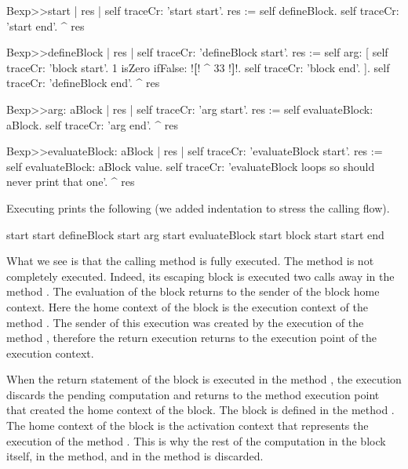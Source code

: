 \documentclass[a4paper,10pt,twoside]{book}
\begin{document}
\begin{code}{}
Bexp>>start
	| res |
	self traceCr: 'start start'.
	res := self defineBlock.
	self traceCr: 'start end'.
	^ res

Bexp>>defineBlock
	| res |
	self traceCr: 'defineBlock start'.
	res := self arg: [ self traceCr: 'block start'.
                            1 isZero ifFalse: !\textbf{[}! ^ 33 !\textbf{]}!.
                            self traceCr: 'block end'. ].
	self traceCr: 'defineBlock end'.
	^ res

Bexp>>arg: aBlock
	| res |
	self traceCr: 'arg start'.
	res := self evaluateBlock: aBlock.
	self traceCr: 'arg end'.
	^ res

Bexp>>evaluateBlock: aBlock
	| res |
	self traceCr: 'evaluateBlock start'.
	res := self evaluateBlock: aBlock value.
	self traceCr: 'evaluateBlock loops so should never print that one'.
	^  res
\end{code}


Executing   prints the following (we added indentation to stress the calling flow).

\begin{code}{}
start start
   defineBlock start
      arg start
         evaluateBlock start
            block start
start end
\end{code}

What we see is that the calling method  is fully executed. The method  is not completely executed. Indeed, its escaping block \ct{[^33]} is executed two calls away in the method . The evaluation of the block returns to the sender of the block home context. Here the home context of the block is the execution context of the method . The sender of this execution was created by the execution of the method , therefore the return execution returns to the execution point of the  execution context.

When the return statement of the block is executed in the method , the execution discards the pending computation and returns to the method execution point that created the home context of the block. The block is defined in  the method . The home context of the block is the activation context that represents the execution of the method . This is why the rest of the computation in the block itself, in the  method, and in the  method is discarded.
\end{document}
